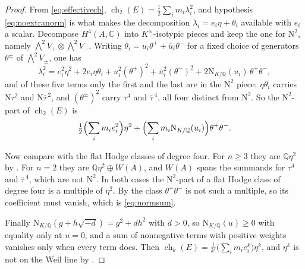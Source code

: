 \documentclass[11pt,reqno]{amsart}
\theoremstyle{plain}
\theoremstyle{definition}
\theoremstyle{remark}
\newcommand{\QQ}{\mathbb{Q}}
\newcommand{\CC}{\mathbb{C}}
\newcommand{\HW}{W}                      %
\newcommand{\Nm}{\mathrm{N}}             %
\DeclareMathOperator{\ch}{ch}
\newcommand{\Kx}{K^{\times}}
\newcommand{\bbar}[1]{\overline{#1}}
\begin{document}
\begin{proof}
From \eqref{eq:effectivech},
$\ch_{2}(E)=\tfrac12\sum_{i}m_{i}\lambda_{i}^{2}$, and hypothesis
\eqref{eq:noextranorm} is what makes the decomposition
$\lambda_{i}=e_{i}\eta+\theta_{i}$ available with $e_{i}$ a scalar. Decompose
$H^{4}(A,\CC)$ into $\Kx$-isotypic pieces and keep the one for $\Nm^{2}$,
namely $\bigwedge^{2}V_{+}\otimes\bigwedge^{2}V_{-}$. Writing
$\theta_{i}=u_{i}\theta^{+}+\bbar u_{i}\theta^{-}$ for a fixed choice of
generators $\theta^{\pm}$ of $\bigwedge^{2}V_{\pm}$, one has
\[
  \lambda_{i}^{2}
  =e_{i}^{2}\eta^{2}
   +2e_{i}\eta\theta_{i}
   +u_{i}^{2}(\theta^{+})^{2}+\bbar u_{i}^{2}(\theta^{-})^{2}
   +2\Nm_{K/\QQ}(u_{i})\,\theta^{+}\theta^{-},
\]
and of these five terms only the first and the last are in the $\Nm^{2}$
piece: $\eta\theta_{i}$ carries $\Nm\tau^{2}$ and $\Nm\bbar\tau^{\,2}$, and
$(\theta^{\pm})^{2}$ carry $\tau^{4}$ and $\bbar\tau^{\,4}$, all four distinct
from $\Nm^{2}$. So the $\Nm^{2}$-part of $\ch_{2}(E)$ is
\[
  \tfrac12\Bigl(\sum_{i}m_{i}e_{i}^{2}\Bigr)\eta^{2}
  +\Bigl(\sum_{i}m_{i}\Nm_{K/\QQ}(u_{i})\Bigr)\theta^{+}\theta^{-}.
\]

Now compare with the flat Hodge classes of degree four. For $n\ge3$ they are
$\QQ\eta^{2}$ by \cite[Theorem~4.14]{paperI}. For $n=2$ they are
$\QQ\eta^{2}\oplus\HW(A)$, and $\HW(A)$ spans the summands for $\tau^{4}$ and
$\bbar\tau^{\,4}$, which are not $\Nm^{2}$. In both cases the $\Nm^{2}$-part
of a flat Hodge class of degree four is a multiple of $\eta^{2}$. By
 the class $\theta^{+}\theta^{-}$ is not such a multiple,
so its coefficient must vanish, which is \eqref{eq:normsum}.

Finally $\Nm_{K/\QQ}(g+h\sqrt{-d})=g^{2}+dh^{2}$ with $d>0$, so
$\Nm_{K/\QQ}(u)\ge0$ with equality only at $u=0$, and a sum of nonnegative
terms with positive weights vanishes only when every term does. Then
$\ch_{k}(E)=\frac{1}{k!}\bigl(\sum_{i}m_{i}e_{i}^{k}\bigr)\eta^{k}$, and
$\eta^{k}$ is not on the Weil line by \cite[Theorem~4.14]{paperI}.
\end{proof}
\end{document}
